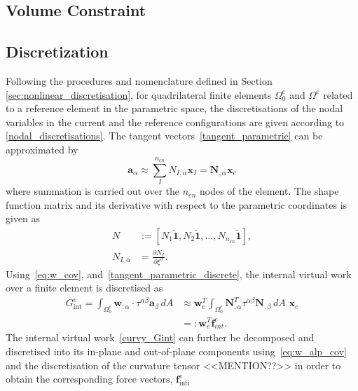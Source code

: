\documentclass[../main.tex]{subfiles}
\begin{document}
\subsection{Volume Constraint}
%
%
\subsection{Discretization}
Following the procedures and nomenclature defined in Section \ref{sec:nonlinear_discretisation}, for quadrilateral finite elements $\Omega^{e}_{0}$ and $\Omega^{e}$
 related to a reference element in the parametric space, the discretisations of the nodal variables in the current and the reference configurations are given according to \eqref{nodal_discretisations}.
The tangent vectors~\eqref{tangent_parametric} can be approximated by
\begin{equation} \label{tangent_parametric_discrete}
    \boldsymbol{a}_{\alpha} \approx \sum^{n_{en}}_{I} N_{I,\alpha} \boldsymbol{x}_{I} = \mathbf{N}_{,\alpha} \mathbf{x}_{e}
\end{equation}
where summation is carried out over the $n_{en}$ nodes of the element. The shape function matrix and its derivative with respect to the parametric coordinates
 is given as
\begin{align} \label{curvy_shape_function}
    N &:= \left[N_{1}\boldsymbol{\tilde{1}}, N_{2} \boldsymbol{\tilde{1}},\dots, N_{n_{en}} \boldsymbol{\tilde{1}}\right],\\
    N_{I,\alpha} & = \frac{\partial N_{I}}{\partial \xi^{\alpha}}.
\end{align}
%
Using~\eqref{eq:w_cov}, and~\eqref{tangent_parametric_discrete}, the internal virtual work
 over a finite element is discretised as
 \begin{equation} \label{curvy_Gint_discrete}
    \begin{split}
    G^{e}_{\text{int}} = \int_{\Omega_{0}^{e}} \boldsymbol{w}_{;\alpha} \cdot \tau^{\alpha \beta} \boldsymbol{a}_{\beta} \,dA 
    &\approx \mathbf{w}^{T}_{e} \int_{\Omega_{0}^{e}} \mathbf{N}^T_{,\alpha} \tau^{\alpha \beta} \mathbf{N}_{,\beta}\,dA \,\, \mathbf{x}_{e}\\ & =: \mathbf{w}^{T}_{e} \mathbf{f}^{e}_{int}.
    \end{split}
 \end{equation}
The internal virtual work~\eqref{curvy_Gint} can further be decomposed and discretised into its in-plane and out-of-plane components
 using~\eqref{eq:w_alp_cov} and the discretisation of the curvature tensor <<MENTION??>> in order to obtain the corresponding force vectors, $\mathbf{f}^{e}_{\text{inti}}$
\end{document}
